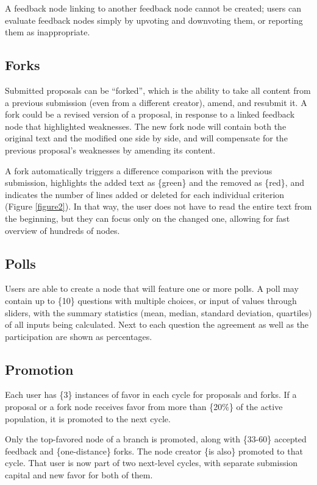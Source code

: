 \documentclass[a4paper,11pt]{article}
\begin{document}
\begin{multicols}{2}
A feedback node linking to another feedback node cannot be created; users can evaluate feedback nodes simply by upvoting and downvoting them, or reporting them as inappropriate.

\subsection{Forks} \label{forks}

Submitted proposals can be “forked”, which is the ability to take all content from a previous submission (even from a different creator), amend, and resubmit it. A fork could be a revised version of a proposal, in response to a linked feedback node that highlighted weaknesses. The new fork node will contain both the original text and the modified one side by side, and will compensate for the previous proposal's weaknesses by amending its content.

A fork automatically triggers a difference comparison with the previous submission, highlights the added text as \{green\} and the removed as \{red\}, and indicates the number of lines added or deleted for each individual criterion (Figure \ref{figure2}). In that way, the user does not have to read the entire text from the beginning, but they can focus only on the changed one, allowing for fast overview of hundreds of nodes.

\subsection{Polls} \label{polls}

Users are able to create a node that will feature one or more polls. A poll may contain up to \{10\} questions with multiple choices, or input of values through sliders, with the summary statistics (mean, median, standard deviation, quartiles) of all inputs being calculated. Next to each question the agreement as well as the participation are shown as percentages.

\subsection{Promotion} \label{promotion}

Each user has \{3\} instances of favor in each cycle for proposals and forks. If a proposal or a fork node receives favor from more than \{20\%\} of the active population, it is promoted to the next cycle.

Only the top-favored node of a branch is promoted, along with \{33-60\} accepted feedback and \{one-distance\} forks. The node creator \{is also\} promoted to that cycle. That user is now part of two next-level cycles, with separate submission capital and new favor for both of them.


\end{multicols}
\end{document}
